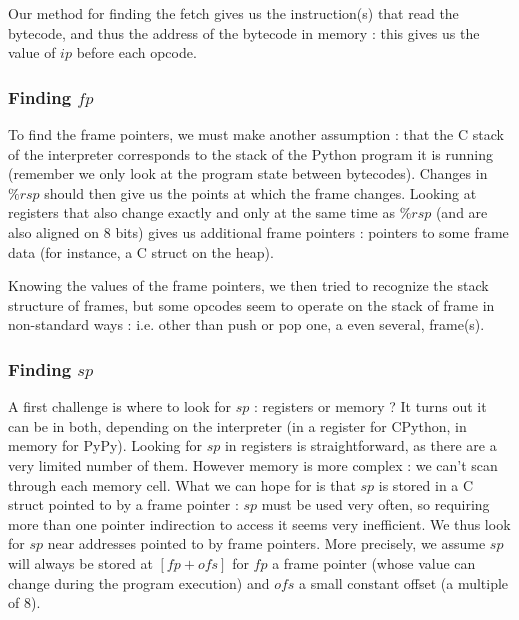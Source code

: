 \documentclass[french]{article}
\begin{document}
Our method for finding the fetch gives us the instruction(s) that read the bytecode, and thus the address of the bytecode in memory : this gives us the value of $ip$ before each opcode.

\subsubsection{Finding $fp$}

To find the frame pointers, we must make another assumption : that the C stack of the interpreter corresponds to the stack of the Python program it is running (remember we only look at the program state between bytecodes). Changes in $\%rsp$ should then give us the points at which the frame changes. Looking at registers that also change exactly and only at the same time as $\%rsp$ (and are also aligned on 8 bits) gives us additional frame pointers : pointers to some frame data (for instance, a C struct on the heap).

Knowing the values of the frame pointers, we then tried to recognize the stack structure of frames, but some opcodes seem to operate on the stack of frame in non-standard ways : i.e. other than push or pop one, a even several, frame(s).

\subsubsection{Finding $sp$}

A first challenge is where to look for $sp$ : registers or memory ? It turns out it can be in both, depending on the interpreter (in a register for CPython, in memory for PyPy). Looking for $sp$ in registers is straightforward, as there are a very limited number of them. However memory is more complex : we can't scan through each memory cell. What we can hope for is that $sp$ is stored in a C struct pointed to by a frame pointer : $sp$ must be used very often, so requiring more than one pointer indirection to access it seems very inefficient. We thus look for $sp$ near addresses pointed to by frame pointers.  More precisely, we assume $sp$ will always be stored at $[fp + ofs]$ for $fp$ a frame pointer (whose value can change during the program execution) and $ofs$ a small constant offset (a multiple of 8).
\end{document}
